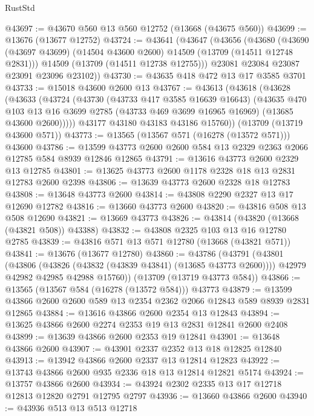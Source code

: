 \begin{lexlean}{RustStd}
\begin{coremodule}
@43697 := @43670 @560 @13 @560 @12752 (@13668 (@43675 @560))
@43699 := @13676 (@13677 @12752)
@43724 := @43641
    (@43647
      (@43656
        (@43680
          (@43690 (@43697 @43699) (@14504 @43600 @2600) @14509 (@13709 (@14511 @12748 @2831)))
          @14509
          (@13709 (@14511 @12738 @12755)))
        @23081
        @23084
        @23087
        @23091
        @23096
        @23102))
@43730 := @43635 @418 @472 @13 @17 @3585 @3701
@43733 := @15018 @43600 @2600 @13
@43767 := @43613
    (@43618
      (@43628
        (@43633
          (@43724
            (@43730
              (@43733 @417 @3585 @16639 @16643)
              (@43635
                @470
                @103
                @13
                @16
                @3699
                @2785
                (@43733 @469 @3699 @16965 @16969)
                (@13685 @43600 @2600)))))
        @43177
        @43180
        @43183
        @43186
        @15760))
    (@13709 (@13719 @43600 @571))
@43773 := @13565 (@13567 @571 (@16278 (@13572 @571))) @43600
@43786 := @13599 @43773 @2600 @2600 @584 @13 @2329 @2363 @2066 @12785 @584 @8939 @12846 @12865
@43791 := @13616 @43773 @2600 @2329 @13 @12785
@43801 := @13625 @43773 @2600 @1178 @2328 @18 @13 @2831 @12783 @2600 @2398
@43806 := @13639 @43773 @2600 @2328 @18 @12783
@43808 := @13648 @43773 @2600
@43814 := @43808 @2290 @2327 @13 @17 @12690 @12782
@43816 := @13660 @43773 @2600
@43820 := @43816 @508 @13 @508 @12690
@43821 := @13669 @43773
@43826 := @43814 (@43820 (@13668 (@43821 @508)) @43388)
@43832 := @43808 @2325 @103 @13 @16 @12780 @2785
@43839 := @43816 @571 @13 @571 @12780 (@13668 (@43821 @571))
@43841 := @13676 (@13677 @12780)
@43860 := @43786
    (@43791
      (@43801
        (@43806 (@43826 (@43832 (@43839 @43841) (@13685 @43773 @2600))))
        @42979
        @42982
        @42985
        @42988
        @15760))
    (@13709 (@13719 @43773 @584))
@43866 := @13565 (@13567 @584 (@16278 (@13572 @584))) @43773
@43879 := @13599 @43866 @2600 @2600 @589 @13 @2354 @2362 @2066 @12843 @589 @8939 @2831 @12865
@43884 := @13616 @43866 @2600 @2354 @13 @12843
@43894 := @13625 @43866 @2600 @2274 @2353 @19 @13 @2831 @12841 @2600 @2408
@43899 := @13639 @43866 @2600 @2353 @19 @12841
@43901 := @13648 @43866 @2600
@43907 := @43901 @2337 @2352 @13 @18 @12825 @12840
@43913 := @13942 @43866 @2600 @2337 @13 @12814 @12823
@43922 := @13743 @43866 @2600 @935 @2336 @18 @13 @12814 @12821 @5174
@43924 := @13757 @43866 @2600
@43934 := @43924 @2302 @2335 @13 @17 @12718 @12813 @12820 @2791 @12795 @2797
@43936 := @13660 @43866 @2600
@43940 := @43936 @513 @13 @513 @12718

\end{coremodule}
\end{lexlean}
